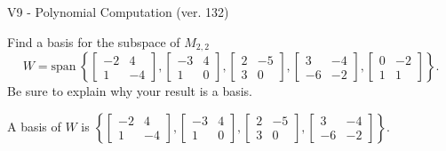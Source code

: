 \begin{exercise}
  \begin{exerciseTitle}V9 - Polynomial Computation (ver. 132)\end{exerciseTitle}
  \begin{exerciseStatement}
    Find a basis for the subspace of \(M_{2,2}\) 
\[W=\mathrm{span}\ \left\{\left[\begin{array}{cc}
-2 & 4 \\
1 & -4
\end{array}\right] , \left[\begin{array}{cc}
-3 & 4 \\
1 & 0
\end{array}\right] , \left[\begin{array}{cc}
2 & -5 \\
3 & 0
\end{array}\right] , \left[\begin{array}{cc}
3 & -4 \\
-6 & -2
\end{array}\right] , \left[\begin{array}{cc}
0 & -2 \\
1 & 1
\end{array}\right]\right\}.\]
 Be sure to explain why your result is a basis.


  \end{exerciseStatement}
  \begin{exerciseAnswer}
   A basis of \(W\) is  \(\left\{\left[\begin{array}{cc}
-2 & 4 \\
1 & -4
\end{array}\right] , \left[\begin{array}{cc}
-3 & 4 \\
1 & 0
\end{array}\right] , \left[\begin{array}{cc}
2 & -5 \\
3 & 0
\end{array}\right] , \left[\begin{array}{cc}
3 & -4 \\
-6 & -2
\end{array}\right]\right\}\).
  


  \end{exerciseAnswer}
\end{exercise}